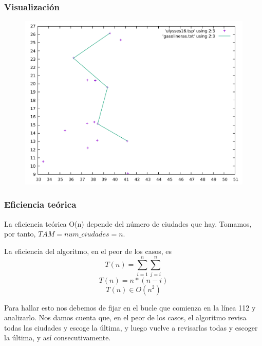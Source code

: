 \documentclass[11pt,a4paper]{article} %
\begin{document}
\subsubsection{Visualización}
\begin{figure}[H]
	\centering
	\includegraphics[width=13cm]{data/graphics/gasolineras/gasolineras.pdf}
\end{figure}

\subsubsection{Eficiencia teórica}
La eficiencia teórica O(n) depende del número de ciudades que hay. Tomamos, por tanto, $TAM = num\_ciudades = n$.

La eficiencia del algoritmo, en el peor de los casos, es 
$$T(n) = \sum_{i=1}^{n}\sum_{j=i}^{n}$$
$$T(n) = n*(n-i)$$
$$T(n) \in O(n^2)$$

Para hallar esto nos debemos de fijar en el bucle que comienza en la línea 112 y analizarlo. Nos damos cuenta que, en el peor de los casos, el algoritmo revisa todas las ciudades y escoge la última, y luego vuelve a revisarlas todas y escoger la última, y así consecutivamente.



\end{document}
